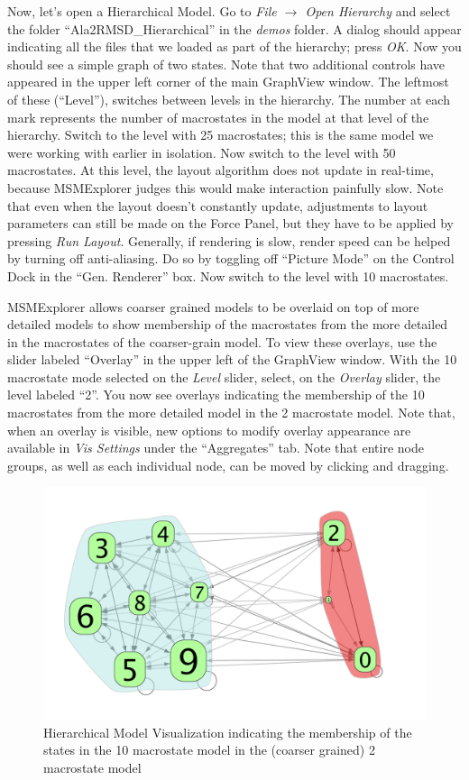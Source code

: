 \documentclass[10pt,a4paper]{report}
\begin{document}
Now, let's open a Hierarchical Model. Go to \emph{File $\rightarrow$ Open Hierarchy} and select the folder ``Ala2RMSD\_Hierarchical'' in the \emph{demos} folder. A dialog should appear indicating all the files that we loaded as part of the hierarchy; press \emph{OK}. Now you should see a simple graph of two states. Note that two additional controls have appeared in the upper left corner of the main GraphView window. The leftmost of these (``Level''), switches between levels in the hierarchy. The number at each mark represents the number of macrostates in the model at that level of the hierarchy. Switch to the level with 25 macrostates; this is the same model we were working with earlier in isolation. Now switch to the level with 50 macrostates. At this level, the layout algorithm does not update in real-time, because MSMExplorer judges this would make interaction painfully slow. Note that even when the layout doesn't constantly update, adjustments to layout parameters can still be made on the Force Panel, but they have to be applied by pressing \emph{Run Layout}. Generally, if rendering is slow, render speed can be helped by turning off anti-aliasing. Do so by toggling off ``Picture Mode'' on the Control Dock in the ``Gen. Renderer'' box. Now switch to the level with 10 macrostates. 

MSMExplorer allows coarser grained models to be overlaid on top of more detailed models to show membership of the macrostates from the more detailed in the macrostates of the coarser-grain model. To view these overlays, use the slider labeled ``Overlay'' in the upper left of the GraphView window. With the 10 macrostate mode selected on the \emph{Level} slider, select, on the \emph{Overlay} slider, the level labeled ``2''. You now see overlays indicating the membership of the 10 macrostates from the more detailed model in the 2 macrostate model. Note that, when an overlay is visible, new options to modify overlay appearance are available in \emph{Vis Settings} under the ``Aggregates'' tab. Note that entire node groups, as well as each individual node, can be moved by clicking and dragging.

\begin{figure}[h]
\includegraphics[scale=.3]{hier.png}
\caption{Hierarchical Model Visualization indicating the membership of the states in the 10 macrostate model in the (coarser grained) 2 macrostate model}
\end{figure}
\end{document}
